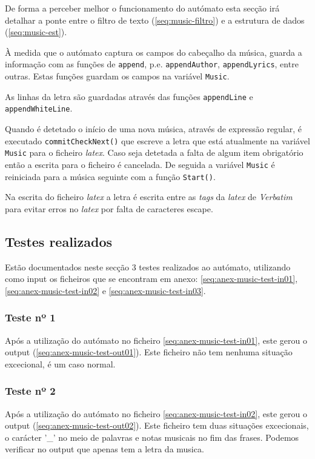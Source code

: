 De forma a perceber melhor o funcionamento do autómato esta secção irá detalhar a ponte entre o filtro de texto (\ref{seq:music-filtro}) e a estrutura de dados (\ref{seq:music-est}).

À medida que o autómato captura os campos do cabeçalho da música, guarda a informação com as funções de \verb!append!, p.e. \verb!appendAuthor!, \verb!appendLyrics!, entre outras. Estas funções guardam os campos na variável \verb!Music!.

As linhas da letra são guardadas através das funções \verb!appendLine! e \verb!appendWhiteLine!.

Quando é detetado o início de uma nova música, através de expressão regular, é executado \verb!commitCheckNext()! que escreve a letra que está atualmente na variável \verb!Music! para o ficheiro \emph{latex}. Caso seja detetada a falta de algum item obrigatório então a escrita para o ficheiro é cancelada.
De seguida a variável \verb!Music! é reiniciada para a música seguinte com a função \verb!Start()!.

Na escrita do ficheiro \emph{latex} a letra é escrita entre as \emph{tags} da \emph{latex} de \emph{Verbatim} para evitar erros no \emph{latex} por falta de caracteres escape.

\subsection{Testes realizados}
\label{seq:music-test}
Estão documentados neste secção 3 testes realizados ao autómato, utilizando como input os ficheiros que se encontram em anexo: \ref{seq:anex-music-test-in01}, \ref{seq:anex-music-test-in02} e \ref{seq:anex-music-test-in03}.

\subsubsection{Teste nº 1}

Após a utilização do autómato no ficheiro \ref{seq:anex-music-test-in01}, este gerou o output (\ref{seq:anex-music-test-out01}).
Este ficheiro não tem nenhuma situação excecional, é um caso normal.

\subsubsection{Teste nº 2}

Após a utilização do autómato no ficheiro \ref{seq:anex-music-test-in02}, este gerou o output (\ref{seq:anex-music-test-out02}).
Este ficheiro tem duas situações excecionais, o carácter '\_' no meio de palavras e notas musicais no fim das frases.
Podemos verificar no output que apenas tem a letra da musica.

